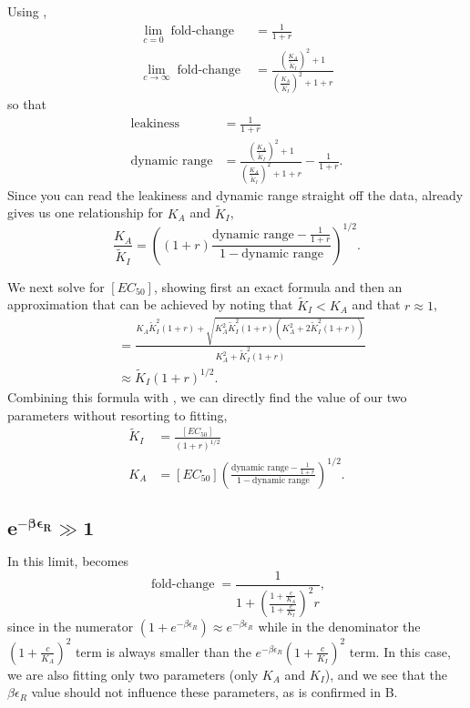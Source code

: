 \documentclass[10pt,letterpaper]{article}
\newcommand{\letter}[1]{#1} %
\newcommand \foldchange{\operatorname{fold-change}}
\begin{document}
Using \eref[AppendixSloppinessEq1], 
\begin{align}
\lim_{c = 0}\foldchange &= \frac{1}{1+r}\\
\lim_{c \to \infty}\foldchange &= \frac{\left(\frac{K_A}{\widetilde{K}_I}\right)^2 + 1}{\left(\frac{K_A}{\widetilde{K}_I}\right)^2 + 1+r}
\end{align}
so that
\begin{align}
\text{leakiness} &= \frac{1}{1+r} \label{AppendixSloppinessEq3} \\
\text{dynamic range} &= \frac{\left(\frac{K_A}{\widetilde{K}_I}\right)^2 + 1}{\left(\frac{K_A}{\widetilde{K}_I}\right)^2 + 1+r} - \frac{1}{1+r}. \label{AppendixSloppinessEq4}
\end{align}
Since you can read the leakiness and dynamic range straight off the data, \eref[AppendixSloppinessEq4] already gives us one relationship for $K_A$ and $\widetilde{K}_I$,
\begin{equation} \label{AppendixSloppinessEq5}
\frac{K_A}{\widetilde{K}_I} = \left( \left(1+r\right) \frac{\text{dynamic range} - \frac{1}{1+r}}{1-\text{dynamic range}} \right)^{1/2}.
\end{equation}

We next solve for $[EC_{50}]$, showing first an exact formula and then an approximation that can be achieved by noting that $\widetilde{K}_I < K_A$ and that $r \approx 1$,
\begin{align}
[EC_{50}] &= \frac{K_A \widetilde{K}_I^2 \left(1+r\right) + \sqrt{K_A^2 \widetilde{K}_I^2 \left(1+r\right) \left(K_A^2 + 2 \widetilde{K}_I^2 \left(1+r\right) \right)}}{K_A^2 + \widetilde{K}_I^2 \left(1+r\right)}\nonumber\\
&\approx \widetilde{K}_I \left(1+r\right)^{1/2}.
\end{align}
Combining this formula with \eref[AppendixSloppinessEq5], we can directly find the value of our two parameters without resorting to fitting,
\begin{align}
\widetilde{K}_I &= \frac{[EC_{50}]}{\left(1+r\right)^{1/2}}\\
K_A &= [EC_{50}] \left(\frac{\text{dynamic range} - \frac{1}{1+r}}{1-\text{dynamic range}} \right)^{1/2}.
\end{align}


\subsection{$\boldsymbol{e^{-\beta \epsilon_R} \gg 1}$}

In this limit, \eref[AppendixSloppinessEq1] becomes 
\begin{equation}
\foldchange = \frac{1}{1+\left(\frac{1 + \frac{c}{K_A}}{1 + \frac{c}{K_I}}\right)^2 r},
\end{equation}
since in the numerator $\left( 1 + e^{-\beta \epsilon_R} \right) \approx
e^{-\beta \epsilon_R}$ while in the denominator the
$\left(1+\frac{c}{K_A}\right)^2$ term is always smaller than the $e^{-\beta
	\epsilon_R} \left(1+\frac{c}{K_I}\right)^2$ term. In this case, we are also
fitting only two parameters (only $K_A$ and $K_I$), and we see that the $\beta
\epsilon_R$ value should not influence these parameters, as is confirmed in
\fref[SIfig1]\letter{B}.
\end{document}
